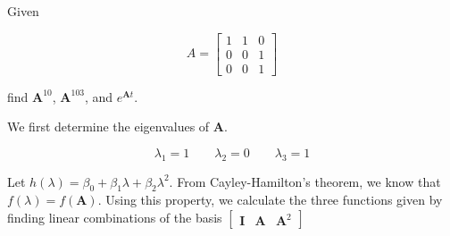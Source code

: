 \item [3.21] Given

\begin{equation*}
 A = \begin{bmatrix}
      1 & 1 & 0\\
      0 & 0 & 1\\
      0 & 0 & 1
     \end{bmatrix}
\end{equation*}

find $\mathbf{A}^{10}$, $\mathbf{A}^{103}$, and $e^{\mathbf{A}t}$.

We first determine the eigenvalues of $\mathbf{A}$.

\begin{equation*}
 \lambda_1 = 1  \qquad \lambda_2 = 0  \qquad  \lambda_3 = 1
\end{equation*}

Let $h(\lambda) = \beta_0 + \beta_1 \lambda + \beta_2 \lambda^2$.
From Cayley-Hamilton's theorem, we know that $f(\lambda) = f(\mathbf{A})$.
Using this property, we calculate the three functions given by finding
linear combinations of the basis $\begin{bmatrix}
                                   \mathbf{I} & \mathbf{A} & \mathbf{A}^2
                                  \end{bmatrix}
$



